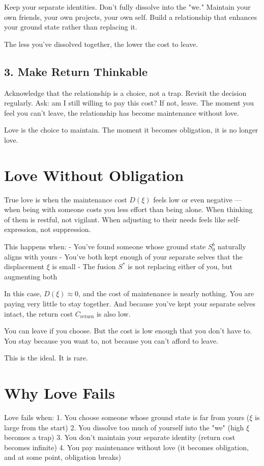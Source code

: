 \documentclass[12pt]{article}
\begin{document}
Keep your separate identities. Don't fully dissolve into the "we." Maintain your own friends, your own projects, your own self. Build a relationship that enhances your ground state rather than replacing it.

The less you've dissolved together, the lower the cost to leave.

\subsection{3. Make Return Thinkable}

Acknowledge that the relationship is a choice, not a trap. Revisit the decision regularly. Ask: am I still willing to pay this cost? If not, leave. The moment you feel you can't leave, the relationship has become maintenance without love.

Love is the choice to maintain. The moment it becomes obligation, it is no longer love.

\section{Love Without Obligation}

True love is when the maintenance cost $D(\xi)$ feels low or even negative — when being with someone costs you less effort than being alone. When thinking of them is restful, not vigilant. When adjusting to their needs feels like self-expression, not suppression.

This happens when:
- You've found someone whose ground state $S_0^b$ naturally aligns with yours
- You've both kept enough of your separate selves that the displacement $\xi$ is small
- The fusion $S^*$ is not replacing either of you, but augmenting both

In this case, $D(\xi) \approx 0$, and the cost of maintenance is nearly nothing. You are paying very little to stay together. And because you've kept your separate selves intact, the return cost $C_{\text{return}}$ is also low.

You can leave if you choose. But the cost is low enough that you don't have to. You stay because you want to, not because you can't afford to leave.

This is the ideal. It is rare.

\section{Why Love Fails}

Love fails when:
1. You choose someone whose ground state is far from yours ($\xi$ is large from the start)
2. You dissolve too much of yourself into the "we" (high $\xi$ becomes a trap)
3. You don't maintain your separate identity (return cost becomes infinite)
4. You pay maintenance without love (it becomes obligation, and at some point, obligation breaks)
\end{document}

